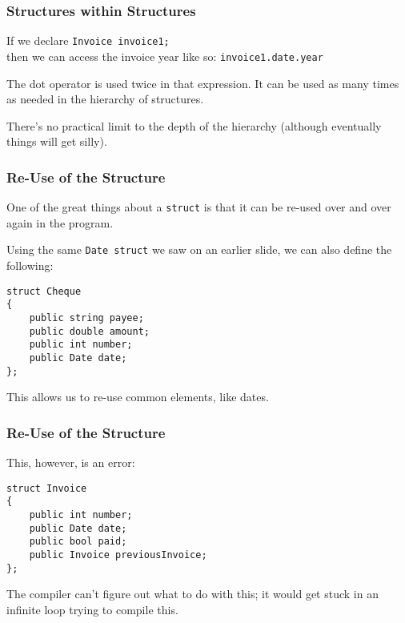\begin{frame}[fragile]
\frametitle{Structures within Structures}

If we declare \texttt{Invoice invoice1;}\\
\quad then we can access the invoice year like so: \texttt{invoice1.date.year}


The dot operator is used twice in that expression. It can be used as many times as needed in the hierarchy of structures.

There's no practical limit to the depth of the hierarchy (although eventually things will get silly).

\end{frame}

\begin{frame}[fragile]
\frametitle{Re-Use of the Structure}

One of the great things about a \texttt{struct} is that it can be re-used over and over again in the program.

Using the same \texttt{Date struct} we saw on an earlier slide, we can also define the following:

\begin{verbatim}
struct Cheque
{
    public string payee;
    public double amount;
    public int number;
    public Date date;
};
\end{verbatim}

This allows us to re-use common elements, like dates.
\end{frame}

\begin{frame}[fragile]
\frametitle{Re-Use of the Structure}

This, however, is an error:

\begin{verbatim}
struct Invoice
{
    public int number;
    public Date date;
    public bool paid;
    public Invoice previousInvoice;
};
\end{verbatim}

The compiler can't figure out what to do with this; it would get stuck in an infinite loop trying to compile this.

\end{frame}




